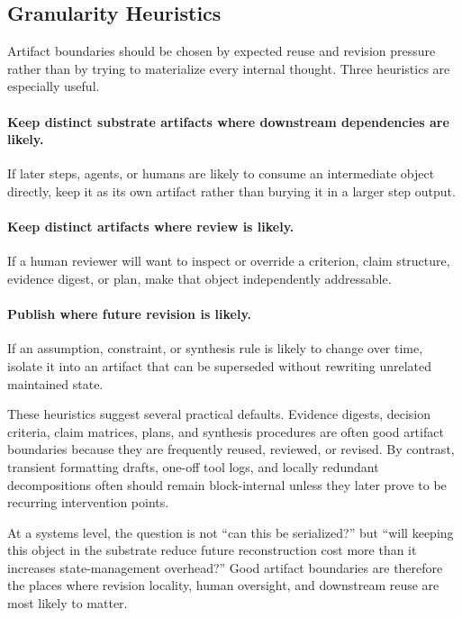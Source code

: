 \documentclass{article}
\begin{document}
\subsection{Granularity Heuristics}

Artifact boundaries should be chosen by expected reuse and revision pressure rather than by trying to materialize every internal thought. Three heuristics are especially useful.

\paragraph{Keep distinct substrate artifacts where downstream dependencies are likely.} If later steps, agents, or humans are likely to consume an intermediate object directly, keep it as its own artifact rather than burying it in a larger step output.

\paragraph{Keep distinct artifacts where review is likely.} If a human reviewer will want to inspect or override a criterion, claim structure, evidence digest, or plan, make that object independently addressable.

\paragraph{Publish where future revision is likely.} If an assumption, constraint, or synthesis rule is likely to change over time, isolate it into an artifact that can be superseded without rewriting unrelated maintained state.

These heuristics suggest several practical defaults. Evidence digests, decision criteria, claim matrices, plans, and synthesis procedures are often good artifact boundaries because they are frequently reused, reviewed, or revised. By contrast, transient formatting drafts, one-off tool logs, and locally redundant decompositions often should remain block-internal unless they later prove to be recurring intervention points.

At a systems level, the question is not ``can this be serialized?'' but ``will keeping this object in the substrate reduce future reconstruction cost more than it increases state-management overhead?'' Good artifact boundaries are therefore the places where revision locality, human oversight, and downstream reuse are most likely to matter.
\end{document}
